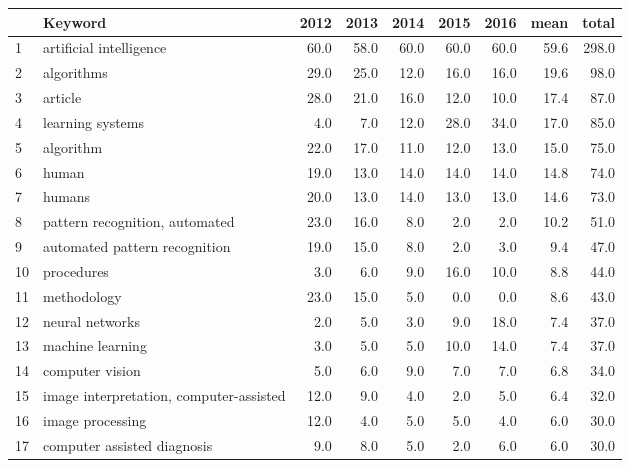 \begin{tabular}{llrrrrrrr}
\toprule
{} &                                  Keyword &  2012 &  2013 &  2014 &  2015 &  2016 &  mean &  total \\
\midrule
1  &                  artificial intelligence &  60.0 &  58.0 &  60.0 &  60.0 &  60.0 &  59.6 &  298.0 \\
2  &                               algorithms &  29.0 &  25.0 &  12.0 &  16.0 &  16.0 &  19.6 &   98.0 \\
3  &                                  article &  28.0 &  21.0 &  16.0 &  12.0 &  10.0 &  17.4 &   87.0 \\
4  &                         learning systems &   4.0 &   7.0 &  12.0 &  28.0 &  34.0 &  17.0 &   85.0 \\
5  &                                algorithm &  22.0 &  17.0 &  11.0 &  12.0 &  13.0 &  15.0 &   75.0 \\
6  &                                    human &  19.0 &  13.0 &  14.0 &  14.0 &  14.0 &  14.8 &   74.0 \\
7  &                                   humans &  20.0 &  13.0 &  14.0 &  13.0 &  13.0 &  14.6 &   73.0 \\
8  &           pattern recognition, automated &  23.0 &  16.0 &   8.0 &   2.0 &   2.0 &  10.2 &   51.0 \\
9  &            automated pattern recognition &  19.0 &  15.0 &   8.0 &   2.0 &   3.0 &   9.4 &   47.0 \\
10 &                               procedures &   3.0 &   6.0 &   9.0 &  16.0 &  10.0 &   8.8 &   44.0 \\
11 &                              methodology &  23.0 &  15.0 &   5.0 &   0.0 &   0.0 &   8.6 &   43.0 \\
12 &                          neural networks &   2.0 &   5.0 &   3.0 &   9.0 &  18.0 &   7.4 &   37.0 \\
13 &                         machine learning &   3.0 &   5.0 &   5.0 &  10.0 &  14.0 &   7.4 &   37.0 \\
14 &                          computer vision &   5.0 &   6.0 &   9.0 &   7.0 &   7.0 &   6.8 &   34.0 \\
15 &  image interpretation, computer-assisted &  12.0 &   9.0 &   4.0 &   2.0 &   5.0 &   6.4 &   32.0 \\
16 &                         image processing &  12.0 &   4.0 &   5.0 &   5.0 &   4.0 &   6.0 &   30.0 \\
17 &              computer assisted diagnosis &   9.0 &   8.0 &   5.0 &   2.0 &   6.0 &   6.0 &   30.0 \\

\end{tabular}
